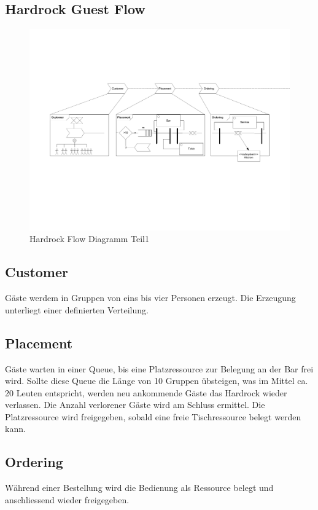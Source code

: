 \documentclass[ngerman,a4paper,12pt]{scrreprt}
\begin{document}
\begin{landscape}
	\section{Hardrock Guest Flow}
		\begin{figure}[H]
			\centering
				\includegraphics[page=1,trim=2cm 7cm 2cm 5cm, clip=true,width=1.4\textwidth]{../model/Modell_v2.pdf}
				\caption[Hardrock Flow Diagramm Teil1]{Hardrock Flow Diagramm Teil1}
				\label{flowDiagramm1}
		\end{figure}
		
		\subsection{Customer}
		Gäste werdem in Gruppen von eins bis vier Personen erzeugt. Die Erzeugung unterliegt einer definierten Verteilung.
		
		\subsection{Placement}
		Gäste warten in einer Queue, bis eine Platzressource zur Belegung an der Bar frei wird. Sollte diese Queue die Länge von 10 Gruppen übsteigen, was im Mittel ca. 20 Leuten entspricht, werden neu ankommende Gäste das Hardrock wieder verlassen. Die Anzahl verlorener Gäste wird am Schluss ermittel. Die Platzressource wird freigegeben, sobald eine freie Tischressource belegt werden kann.
		
		\subsection{Ordering}
		Während einer Bestellung wird die Bedienung als Ressource belegt und anschliessend wieder freigegeben.
		

\end{landscape}
\end{document}
